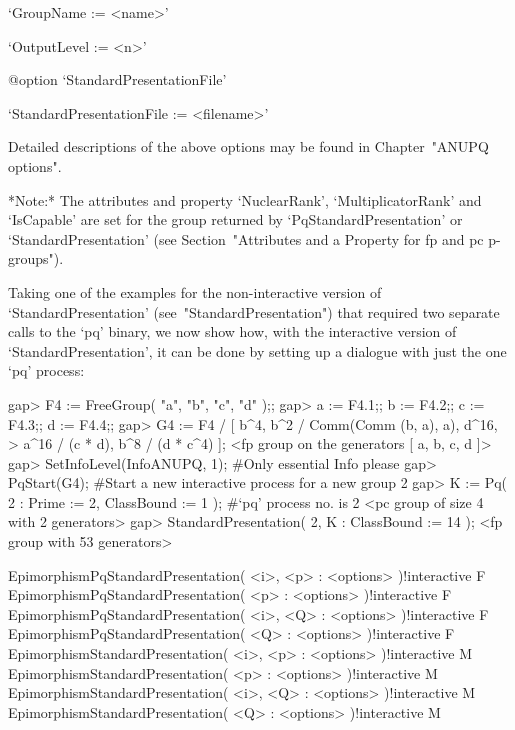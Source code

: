\item{}`GroupName := <name>'

\item{}`OutputLevel := <n>'

%
{@option \noexpand`StandardPresentationFile'}
\item{}`StandardPresentationFile := <filename>'

\endlist

Detailed descriptions of the above options may be found in Chapter~"ANUPQ
options".

*Note:*
The  attributes  and  property  `NuclearRank',  `MultiplicatorRank'   and
`IsCapable' are set for the group returned by `PqStandardPresentation' or
`StandardPresentation' (see Section~"Attributes and a Property for fp and  
pc p-groups").

Taking  one  of  the  examples  for  the   non-interactive   version   of
`StandardPresentation'  (see~"StandardPresentation")  that  required  two
separate calls to the `pq' binary, we now show how, with the  interactive
version of `StandardPresentation',  it  can  be  done  by  setting  up  a
dialogue with just the one `pq' process:

\beginexample
gap> F4 := FreeGroup( "a", "b", "c", "d" );;
gap> a := F4.1;; b := F4.2;; c := F4.3;; d := F4.4;;
gap> G4 := F4 / [ b^4, b^2 / Comm(Comm (b, a), a), d^16,
>                 a^16 / (c * d), b^8 / (d * c^4) ];
<fp group on the generators [ a, b, c, d ]>
gap> SetInfoLevel(InfoANUPQ, 1); #Only essential Info please
gap> PqStart(G4); #Start a new interactive process for a new group
2
gap> K := Pq( 2 : Prime := 2, ClassBound := 1 ); #`pq' process no. is 2
<pc group of size 4 with 2 generators>
gap> StandardPresentation( 2, K : ClassBound := 14 );
<fp group with 53 generators>
\endexample

\>EpimorphismPqStandardPresentation( <i>, <p> : <options> )!{interactive} F
\>EpimorphismPqStandardPresentation( <p> : <options> )!{interactive} F
\>EpimorphismPqStandardPresentation( <i>, <Q> : <options> )!{interactive} F
\>EpimorphismPqStandardPresentation( <Q> : <options> )!{interactive} F
\>EpimorphismStandardPresentation( <i>, <p> : <options> )!{interactive} M
\>EpimorphismStandardPresentation( <p> : <options> )!{interactive} M
\>EpimorphismStandardPresentation( <i>, <Q> : <options> )!{interactive} M
\>EpimorphismStandardPresentation( <Q> : <options> )!{interactive} M

